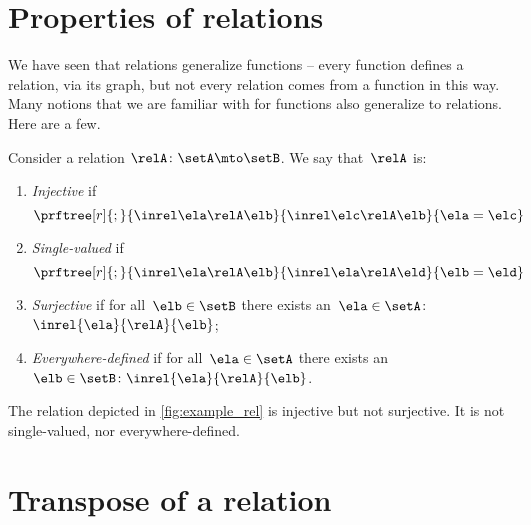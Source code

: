 
\section{Properties of relations}

We have seen that relations generalize functions -- every function defines a relation, via its graph, but not every relation comes from a function in this way.
Many notions that we are familiar with for functions also generalize to relations.
Here are a few.

\begin{ctdefinition}
	\label{def:rel_properties}
	Consider a relation $\relA \colon \setA \mto \setB$.
	We say that~$\relA$ is:
	\begin{enumerate}
		\item \emph{Injective} if
		      \begin{equation}
			      \prftree[r]{;}{
				      \inrel \ela \relA \elb
			      }{
				      \inrel \elc \relA \elb
			      }{
				      \ela=\elc
			      }
		      \end{equation}
		\item \emph{Single-valued} if
		      \begin{equation}
			      \prftree[r]{;}{
				      \inrel \ela \relA \elb
			      }{
				      \inrel \ela \relA \eld
			      }{
				      \elb = \eld
			      }
		      \end{equation}
		\item \emph{Surjective} if for all~$\elb\in \setB$ there exists an~$\ela\in \setA$:~$\inrel{\ela}{\relA}{\elb}$;
		\item \emph{Everywhere-defined} if for all~$\ela\in \setA$ there exists an ~$\elb \in \setB\colon \inrel{\ela}{\relA}{\elb}$.
	\end{enumerate}
\end{ctdefinition}

\begin{example}
	The relation depicted in \cref{fig:example_rel} is injective but not surjective.
	It is not single-valued, nor everywhere-defined.
\end{example}

\section{Transpose of a relation}

